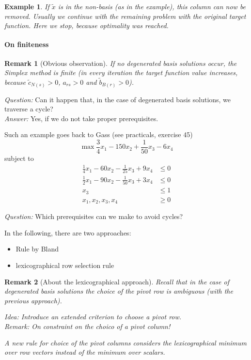 \documentclass[a4paper]{article}
\numberwithin{lecref}{subsection}
\newtheorem*{Example}{Example}
\newtheorem*{Remark}{Remark}
\begin{document}
\begin{Example}
	If $\tilde x$ is in the non-basis (as in the example), this column can now be removed.
	Usually we continue with the remaining problem with the original target function.
	Here we stop, because optimality was reached.
\end{Example}

\paragraph{On finiteness}

\begin{Remark}[Obvious observation]
	If no degenerated basis solutions occur,
	the Simplex method is finite (in every iteration the target function value increases, because $\tilde c_{N(s)} > 0$, $a_{rs} > 0$ and $\tilde b_{B(r)} > 0$).
\end{Remark}

\emph{Question:} Can it happen that, in the case of degenerated basis solutions, we traverse a cycle? \\
\emph{Answer:} Yes, if we do not take proper prerequisites.

Such an example goes back to Gass (see practicals, exercise 45)
\[ \max \frac34 x_1 - 150 x_2 + \frac1{50} x_3 - 6x_4 \]
subject to
\begin{align*}
	\frac14 x_1 - 60 x_2 - \frac1{25} x_3 + 9 x_4 &\leq 0 \\
	\frac12 x_1 - 90 x_2 - \frac1{50} x_3 + 3 x_4 &\leq 0 \\
	x_3 &\leq 1 \\
	x_1, x_2, x_3, x_4 &\geq 0
\end{align*}

\emph{Question:} Which prerequisites can we make to avoid cycles?

In the following, there are two approaches:
\begin{itemize}
	\item Rule by Bland
	\item lexicographical row selection rule
\end{itemize}

\begin{Remark}[About the lexicographical approach]
	Recall that in the case of degenerated basis solutions the choice of the pivot row is ambiguous (with the previous approach).

	\emph{Idea:} Introduce an extended criterion to choose a pivot row. \\
	\emph{Remark:} On constraint on the choico of a pivot column!

	A new rule for choice of the pivot columns considers the lexicographical minimum over row vectors instead of the minimum over scalars.
\end{Remark}
\end{document}

